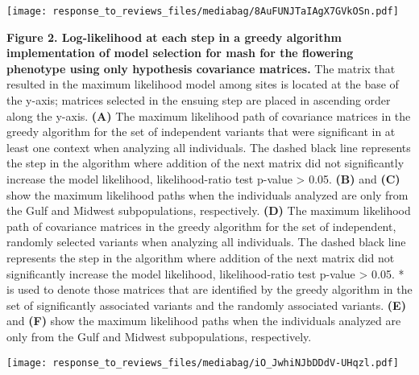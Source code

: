 \documentclass[
  letterpaper,
  DIV=11,
  numbers=noendperiod]{scrartcl}
\begin{document}
\hfill\break

\texttt{[image: response\_to\_reviews\_files/mediabag/8AuFUNJTaIAgX7GVkOSn.pdf]}

\textbf{Figure 2. Log-likelihood at each step in a greedy algorithm
implementation of model selection for mash for the flowering phenotype
using only hypothesis covariance matrices.} The matrix that resulted in
the maximum likelihood model among sites is located at the base of the
y-axis; matrices selected in the ensuing step are placed in ascending
order along the y-axis. \textbf{(A)} The maximum likelihood path of
covariance matrices in the greedy algorithm for the set of independent
variants that were significant in at least one context when analyzing
all individuals. The dashed black line represents the step in the
algorithm where addition of the next matrix did not significantly
increase the model likelihood, likelihood-ratio test p-value
\textgreater{} 0.05. \textbf{(B)} and \textbf{(C)} show the maximum
likelihood paths when the individuals analyzed are only from the Gulf
and Midwest subpopulations, respectively. \textbf{(D)} The maximum
likelihood path of covariance matrices in the greedy algorithm for the
set of independent, randomly selected variants when analyzing all
individuals. The dashed black line represents the step in the algorithm
where addition of the next matrix did not significantly increase the
model likelihood, likelihood-ratio test p-value \textgreater{} 0.05. *
is used to denote those matrices that are identified by the greedy
algorithm in the set of significantly associated variants and the
randomly associated variants. \textbf{(E)} and \textbf{(F)} show the
maximum likelihood paths when the individuals analyzed are only from the
Gulf and Midwest subpopulations, respectively.

\hfill\break

\texttt{[image: response\_to\_reviews\_files/mediabag/iO\_JwhiNJbDDdV-UHqzl.pdf]}
\end{document}
